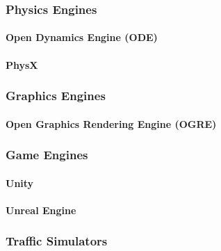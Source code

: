 \subsubsection{Physics Engines}

\paragraph{Open Dynamics Engine (ODE)}
\paragraph{PhysX}


\subsubsection{Graphics Engines}  %
\paragraph{Open Graphics Rendering Engine (OGRE)}

\subsubsection{Game Engines}

\paragraph{Unity}

\paragraph{Unreal Engine}


\subsubsection{Traffic Simulators}
